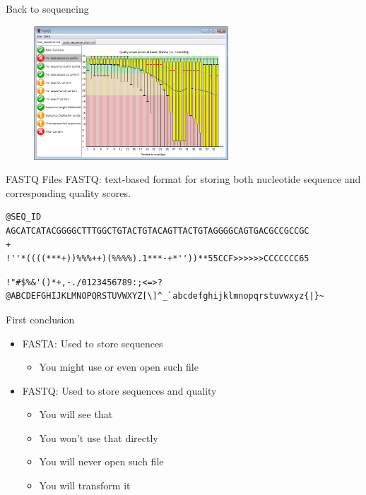 \documentclass[usepdftitle=false]{beamer}
\begin{document}
\begin{frame}{Back to sequencing}
	\begin{figure}
		\includegraphics[height=5cm]{pictures/fastqc.png}
	\end{figure}
\end{frame}

\begin{frame}[fragile]{FASTQ Files}
	FASTQ: text-based format for storing both nucleotide sequence and corresponding quality scores.
	\pause

	\begin{verbatim}
@SEQ_ID
AGCATCATACGGGGCTTTGGCTGTACTGTACAGTTACTGTAGGGGCAGTGACGCCGCCGC
+
!''*((((***+))%%%++)(%%%%).1***-+*''))**55CCF>>>>>>CCCCCCC65
	\end{verbatim}
	\pause
	\begin{verbatim}
!"#$%&'()*+,-./0123456789:;<=>?@ABCDEFGHIJKLMNOPQRSTUVWXYZ[\]^_`abcdefghijklmnopqrstuvwxyz{|}~
	\end{verbatim}
\end{frame}

\begin{frame}{First conclusion}
	\begin{itemize}
		\item FASTA: Used to store sequences
		\begin{itemize}
			\item You might use or even open such file
		\end{itemize}
		\pause
		\item FASTQ: Used to store sequences and quality
		\begin{itemize}
			\item You will see that
			\item You won't use that directly
			\item You will never open such file
			\item You will transform it
		\end{itemize}
	\end{itemize}
\end{frame}
\end{document}
